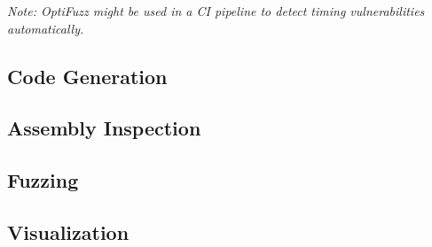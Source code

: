 \textit{Note: OptiFuzz might be used in a CI pipeline to detect timing vulnerabilities automatically.}
\subsection{Code Generation}
\subsection{Assembly Inspection}
\subsection{Fuzzing}
\subsection{Visualization}